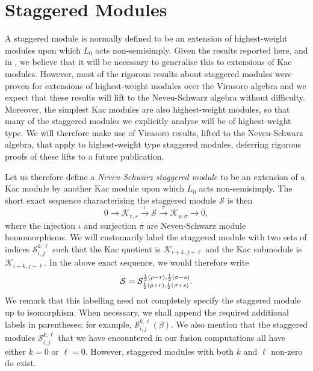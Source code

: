 \documentclass[a4paper,reqno,12pt]{report}
\theoremstyle{definition}
\numberwithin{equation}{section}
\let\originalleft\left     %
\let\originalright\right
\renewcommand{\left}{\mathopen{}\mathclose\bgroup\originalleft}
\renewcommand{\right}{\aftergroup\egroup\originalright}
\newcommand{\brac}[1]{\left( #1 \right)}
\newcommand{\lra}{\longrightarrow}
\newcommand{\Kac}[1]{\mathcal{K}_{#1}}       %
\newcommand{\Stag}[2]{\mathcal{S}_{#1}^{#2}} %
\newcommand{\dses}[5]{0 \lra #1 \overset{#2}{\lra} #3 \overset{#4}{\lra} #5 \lra 0} %
\newcommand{\hw}{highest-weight}
\newcommand{\hwms}{\hw{} modules}
\newcommand{\ns}{Neveu-Schwarz}
\theoremstyle{plain}
\begin{document}
\chapter{Staggered Modules} \label{app:Stag}

A staggered module is normally defined to be an extension of \hwms{} upon which $L_0$ acts non-semisimply.  Given the results reported here, and in \cite{RasCla11,MorKac15}, we believe that it will be necessary to generalise this to extensions of Kac modules.  However, most of the rigorous results \cite{RohRed96,RidSta09} about staggered modules were proven for extensions of \hwms{} over the Virasoro algebra and we expect that these results will lift to the \ns{} algebra without difficulty.  Moreover, the simplest Kac modules are also \hwms{}, so that many of the staggered modules we explicitly analyse will be of \hw{} type.  We will therefore make use of Virasoro results, lifted to the \ns{} algebra, that apply to \hw{} type staggered modules, deferring rigorous proofs of these lifts to a future publication.

Let us therefore define a \emph{\ns{} staggered module} to be an extension of a Kac module by another Kac module upon which $L_0$ acts non-semisimply.  The short exact sequence characterising the staggered module $\Stag{}{}$ is then
\begin{equation} \label{ses:DefStag}
\dses{\Kac{r,s}}{\iota}{\Stag{}{}}{\pi}{\Kac{\rho,\sigma}},
\end{equation}
where the injection $\iota$ and surjection $\pi$ are \ns{} module homomorphisms.  We will customarily label the staggered module with two sets of indices $\Stag{i,j}{k,\ell}$ such that the Kac quotient is $\Kac{i+k,j+\ell}$ and the Kac submodule is $\Kac{i-k,j-\ell}$.  In the above exact sequence, we would therefore write
\begin{equation}
\Stag{}{} = \Stag{\frac{1}{2} \brac{\rho+r}, \frac{1}{2} \brac{\sigma+s}}{\frac{1}{2} \brac{\rho-r}, \frac{1}{2} \brac{\sigma-s}}.
\end{equation}
We remark that this labelling need not completely specify the staggered module up to isomorphism.  When necessary, we shall append the required additional labels in parentheses; for example, $\Stag{i,j}{k,\ell}(\beta)$.  We also mention that the staggered modules $\Stag{i,j}{k,\ell}$ that we have encountered in our fusion computations all have either $k=0$ or $\ell = 0$.  
However, staggered modules with both $k$ and $\ell$ non-zero do exist.
\end{document}
